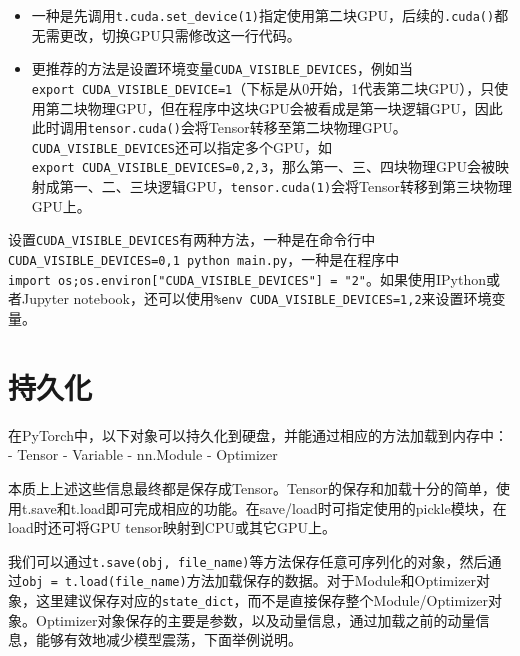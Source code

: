 \documentclass[11pt]{article}
\providecommand{\tightlist}{%
      \setlength{\itemsep}{0pt}\setlength{\parskip}{0pt}}
\begin{document}
\begin{itemize}
\tightlist
\item
  一种是先调用\texttt{t.cuda.set\_device(1)}指定使用第二块GPU，后续的\texttt{.cuda()}都无需更改，切换GPU只需修改这一行代码。
\item
  更推荐的方法是设置环境变量\texttt{CUDA\_VISIBLE\_DEVICES}，例如当\texttt{export\ CUDA\_VISIBLE\_DEVICE=1}（下标是从0开始，1代表第二块GPU），只使用第二块物理GPU，但在程序中这块GPU会被看成是第一块逻辑GPU，因此此时调用\texttt{tensor.cuda()}会将Tensor转移至第二块物理GPU。\texttt{CUDA\_VISIBLE\_DEVICES}还可以指定多个GPU，如\texttt{export\ CUDA\_VISIBLE\_DEVICES=0,2,3}，那么第一、三、四块物理GPU会被映射成第一、二、三块逻辑GPU，\texttt{tensor.cuda(1)}会将Tensor转移到第三块物理GPU上。
\end{itemize}

设置\texttt{CUDA\_VISIBLE\_DEVICES}有两种方法，一种是在命令行中\texttt{CUDA\_VISIBLE\_DEVICES=0,1\ python\ main.py}，一种是在程序中\texttt{import\ os;os.environ{[}"CUDA\_VISIBLE\_DEVICES"{]}\ =\ "2"}。如果使用IPython或者Jupyter
notebook，还可以使用\texttt{\%env\ CUDA\_VISIBLE\_DEVICES=1,2}来设置环境变量。

    \section{持久化}\label{ux6301ux4e45ux5316}

在PyTorch中，以下对象可以持久化到硬盘，并能通过相应的方法加载到内存中：
- Tensor - Variable - nn.Module - Optimizer

本质上上述这些信息最终都是保存成Tensor。Tensor的保存和加载十分的简单，使用t.save和t.load即可完成相应的功能。在save/load时可指定使用的pickle模块，在load时还可将GPU
tensor映射到CPU或其它GPU上。

我们可以通过\texttt{t.save(obj,\ file\_name)}等方法保存任意可序列化的对象，然后通过\texttt{obj\ =\ t.load(file\_name)}方法加载保存的数据。对于Module和Optimizer对象，这里建议保存对应的\texttt{state\_dict}，而不是直接保存整个Module/Optimizer对象。Optimizer对象保存的主要是参数，以及动量信息，通过加载之前的动量信息，能够有效地减少模型震荡，下面举例说明。
\end{document}
